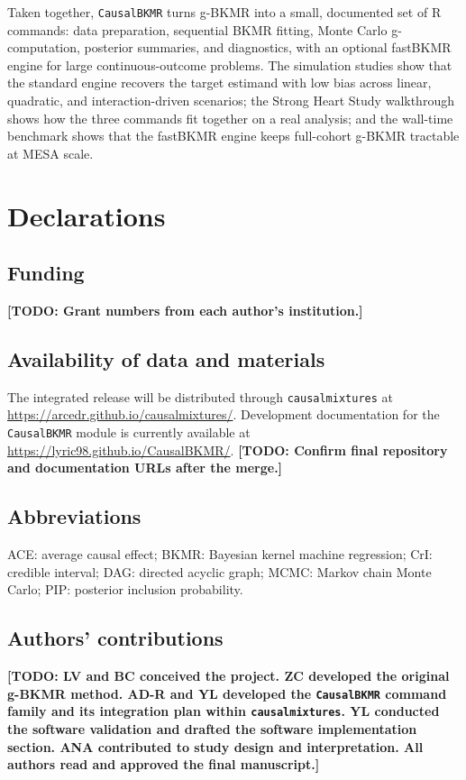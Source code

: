 \documentclass[11pt]{article}
\newcommand{\todo}[1]{{\color{red}\textbf{[TODO: #1]}}}
\newcommand{\pkg}[1]{\texttt{#1}}
\begin{document}
Taken together, \pkg{CausalBKMR} turns g-BKMR into a small, documented set of R commands: data preparation, sequential BKMR fitting, Monte Carlo g-computation, posterior summaries, and diagnostics, with an optional fastBKMR engine for large continuous-outcome problems. The simulation studies show that the standard engine recovers the target estimand with low bias across linear, quadratic, and interaction-driven scenarios; the Strong Heart Study walkthrough shows how the three commands fit together on a real analysis; and the wall-time benchmark shows that the fastBKMR engine keeps full-cohort g-BKMR tractable at MESA scale.

\section*{Declarations}

\subsection*{Funding}
\todo{Grant numbers from each author's institution.}

\subsection*{Availability of data and materials}
The integrated release will be distributed through \pkg{causalmixtures} at \url{https://arcedr.github.io/causalmixtures/}. Development documentation for the \pkg{CausalBKMR} module is currently available at \url{https://lyric98.github.io/CausalBKMR/}. \todo{Confirm final repository and documentation URLs after the merge.}

\subsection*{Abbreviations}
ACE: average causal effect; BKMR: Bayesian kernel machine regression; CrI: credible interval; DAG: directed acyclic graph; MCMC: Markov chain Monte Carlo; PIP: posterior inclusion probability.

\subsection*{Authors' contributions}
\todo{LV and BC conceived the project. ZC developed the original g-BKMR method. AD-R and YL developed the \pkg{CausalBKMR} command family and its integration plan within \pkg{causalmixtures}. YL conducted the software validation and drafted the software implementation section. ANA contributed to study design and interpretation. All authors read and approved the final manuscript.}
\end{document}
